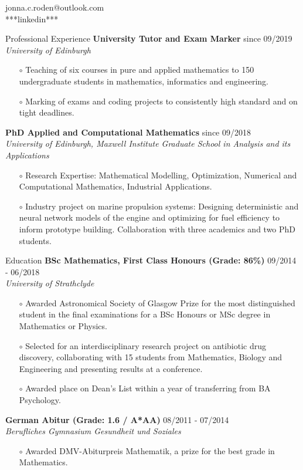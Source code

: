 \documentclass{resume} %
\begin{document}
 \hfill{jonna.c.roden@outlook.com} \\
 \hfill{***linkedin***}\\
\begin{rSection}{Professional Experience}
	{\bf University Tutor and Exam Marker} \hfill{since 09/2019}\\
	{\it University of Edinburgh}
	\begin{itemize}
		\item[$\circ$] Teaching of six courses in pure and applied mathematics to 150 undergraduate students in mathematics, informatics and engineering.
		\item[$\circ$] Marking of exams and coding projects to consistently high standard and on tight deadlines.
	\end{itemize}
	{\bf PhD Applied and Computational Mathematics} \hfill{since 09/2018}\\
	{\it University of Edinburgh, Maxwell Institute Graduate School in Analysis and its Applications}
	\begin{itemize}
		\item[$\circ$] Research Expertise: Mathematical Modelling, Optimization, Numerical and Computational Mathematics, Industrial Applications.
		\item[$\circ$] Industry project on marine propulsion systems: Designing deterministic and neural network models of the engine and optimizing for fuel efficiency to inform prototype building. Collaboration with three academics and two PhD students. 
	\end{itemize}
\end{rSection}		
\begin{rSection}{Education}	
{\bf BSc Mathematics, First Class Honours (Grade: 86\%)} \hfill{09/2014 - 06/2018}	\\
{\it University of Strathclyde}
\begin{itemize}
	\item[$\circ$] Awarded Astronomical Society of Glasgow Prize for the most distinguished student in the final examinations for a BSc Honours or MSc degree in Mathematics or Physics.
	\item[$\circ$] Selected for an interdisciplinary research project on antibiotic drug discovery, collaborating with 15 students from Mathematics, Biology and Engineering and presenting results at a conference.
	\item[$\circ$] Awarded place on Dean's List within a year of transferring from BA Psychology.
\end{itemize}
{\bf German Abitur (Grade: 1.6 / A*AA)} \hfill{08/2011 - 07/2014}\\
{\it Berufliches Gymnasium Gesundheit und Soziales}	
\begin{itemize}
	\item[$\circ$] Awarded DMV-Abiturpreis Mathematik, a prize for the best grade in Mathematics.
\end{itemize}	
\end{rSection}	
\end{document}
